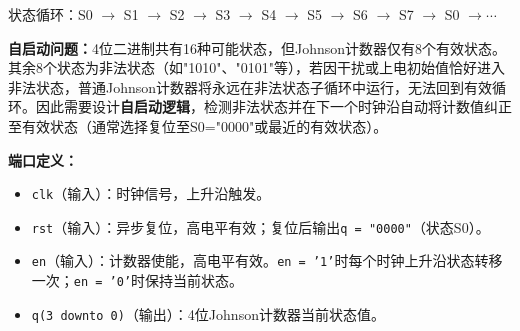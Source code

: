 状态循环：S0 $\to$ S1 $\to$ S2 $\to$ S3 $\to$ S4 $\to$ S5 $\to$ S6 $\to$ S7 $\to$ S0 $\to\cdots$

\textbf{自启动问题：}4位二进制共有16种可能状态，但Johnson计数器仅有8个有效状态。其余8个状态为非法状态（如"1010"、"0101"等），若因干扰或上电初始值恰好进入非法状态，普通Johnson计数器将永远在非法状态子循环中运行，无法回到有效循环。因此需要设计\textbf{自启动逻辑}，检测非法状态并在下一个时钟沿自动将计数值纠正至有效状态（通常选择复位至S0="0000"或最近的有效状态）。

\vspace{0.3cm}

\textbf{端口定义：}
\begin{itemize}
  \item \texttt{clk}（输入）：时钟信号，上升沿触发。
  \item \texttt{rst}（输入）：异步复位，高电平有效；复位后输出\texttt{q = "0000"}（状态S0）。
  \item \texttt{en}（输入）：计数器使能，高电平有效。\texttt{en = '1'}时每个时钟上升沿状态转移一次；\texttt{en = '0'}时保持当前状态。
  \item \texttt{q(3~downto~0)}（输出）：4位Johnson计数器当前状态值。
\end{itemize}

\vspace{0.3cm}

